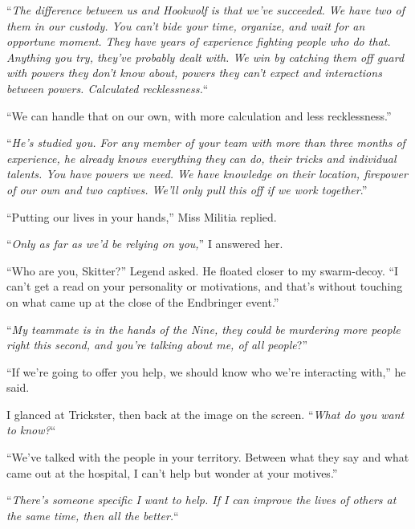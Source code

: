 ``\emph{The difference between us and Hookwolf is that we've succeeded.  We have two of them in our custody.  You can't bide your time, organize, and wait for an opportune moment.  They have years of experience fighting people who do that.  Anything you try, they've probably dealt with.  We win by catching them off guard with powers they don't know about, powers they can't expect and interactions between powers.  Calculated recklessness.}``



``We can handle that on our own, with more calculation and less recklessness.''



``\emph{He's studied you.  For any member of your team with more than three months of experience, he already knows everything they can do, their tricks and individual talents.  You have powers we need.  We have knowledge on their location, firepower of our own and two captives.  We'll only pull this off if we work together}.''



``Putting our lives in your hands,'' Miss Militia replied.



``\emph{Only as far as we'd be relying on you,}'' I answered her.



``Who are you, Skitter?''  Legend asked.  He floated closer to my swarm-decoy.  ``I can't get a read on your personality or motivations, and that's without touching on what came up at the close of the Endbringer event.''



``\emph{My teammate is in the hands of the Nine, they could be murdering more people right this second, and you're talking about me, of all people}?''



``If we're going to offer you help, we should know who we're interacting with,'' he said.



I glanced at Trickster, then back at the image on the screen.  ``\emph{What do you want to know?}``



``We've talked with the people in your territory.  Between what they say and what came out at the hospital, I can't help but wonder at your motives.''



``\emph{There's someone specific I want to help.  If I can improve the lives of others at the same time, then all the better.}``



